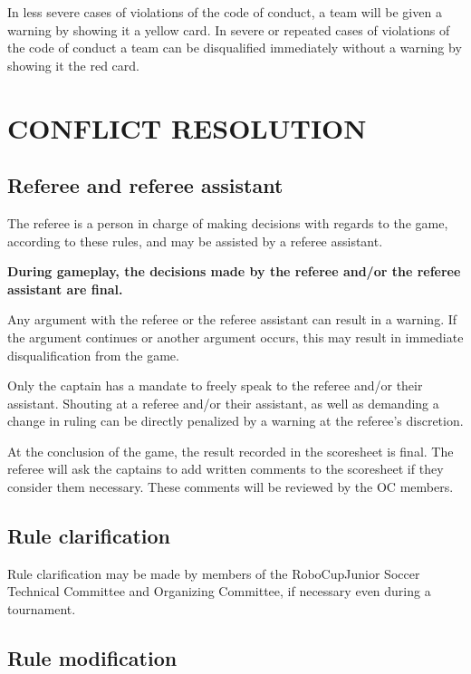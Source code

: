 \documentclass{article}
\begin{document}
In less severe cases of violations of the code of conduct, a team will be given
a warning by showing it a yellow card. In severe or repeated cases of
violations of the code of conduct a team can be disqualified immediately
without a warning by showing it the red card.

\section{CONFLICT RESOLUTION \label{ref-conflict-resolution}}

\subsection{Referee and referee assistant \label{ref-048}}

The referee is a person in charge of making decisions with regards to the game,
according to these rules, and may be assisted by a referee assistant.

\textbf{During gameplay, the decisions made by the referee and/or the referee assistant are final.}

Any argument with the referee or the referee assistant can result in a warning.
If the argument continues or another argument occurs, this may result in
immediate disqualification from the game.

Only the captain has a mandate to freely speak to the referee
and/or their assistant. Shouting at a referee and/or their assistant, as well
as demanding a change in ruling can be directly penalized by a warning at
the referee's discretion.

At the conclusion of the game, the result recorded in the scoresheet is final.
The referee will ask the captains to add written comments to the scoresheet if
they consider them necessary. These comments will be reviewed by the OC
members.

\subsection{Rule clarification \label{ref-049}}

Rule clarification may be made by members of the RoboCupJunior Soccer Technical
Committee and Organizing Committee, if necessary even during a tournament.

\subsection{Rule modification \label{ref-050}}
\end{document}
